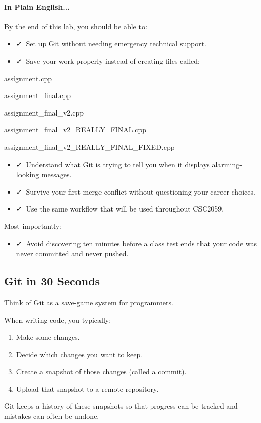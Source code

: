 \documentclass{csc2059practical}
\begin{document}
\paragraph{In Plain English...}
By the end of this lab, you should be able to:

\begin{itemize}
  \item \faCheck\ Set up Git without needing emergency technical support.
  \item \faCheck\ Save your work properly instead of creating files called:
\end{itemize}
\begin{terminalplain}
assignment.cpp

assignment\_final.cpp

assignment\_final\_v2.cpp

assignment\_final\_v2\_REALLY\_FINAL.cpp

assignment\_final\_v2\_REALLY\_FINAL\_FIXED.cpp
\end{terminalplain}
\begin{itemize}
  \item \faCheck\ Understand what Git is trying to tell you when it displays alarming-looking messages.
  \item \faCheck\ Survive your first merge conflict without questioning your career choices.
  \item \faCheck\ Use the same workflow that will be used throughout CSC2059.
\end{itemize}
Most importantly:

\begin{itemize}
  \item \faCheck\ Avoid discovering ten minutes before a class test ends that your code was never committed and never pushed.
\end{itemize}
\subsection*{Git in 30 Seconds}
Think of Git as a save-game system for programmers.

When writing code, you typically:

\begin{enumerate}
  \item Make some changes.
  \item Decide which changes you want to keep.
  \item Create a snapshot of those changes (called a commit).
  \item Upload that snapshot to a remote repository.
\end{enumerate}
Git keeps a history of these snapshots so that progress can be tracked and mistakes can often be undone.
\end{document}
